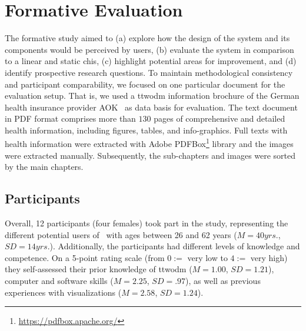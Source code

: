 \section{Formative Evaluation}\label{sec:evaluation}

The formative study aimed to 
(a) explore how the design of the system and its components would be perceived by users, 
(b) evaluate the system in comparison to a linear and static \acrshort{chis}, 
(c) highlight potential areas for improvement, and 
(d) identify prospective research questions.
%
To maintain methodological consistency and participant comparability, we focused on one particular document for the evaluation setup. 
%
That is, we used a \acrshort{ttwodm} information brochure of the German health insurance provider AOK~\cite{aok} as data basis for evaluation. 
%
The text document in PDF format comprises more than $130$ pages of comprehensive and detailed health information, including figures, tables, and info-graphics. 
%
Full texts with health information were extracted with Adobe PDFBox\footnote{\url{https://pdfbox.apache.org/}} library and the images were extracted manually. 
%
Subsequently, the sub-chapters and images were sorted by the main chapters. 


\subsection{Participants}
%
Overall, 12 participants (four females) took part in the study, representing the different potential users of \apluschis\ with ages between 26 and 62 years ($M = 40 \unit{yrs.}$, $SD = 14 \unit{yrs.}$). 
%
Additionally, the participants had different levels of knowledge and competence. On a 5-point rating scale (from $0 := $ very low to $4 := $ very high) they self-assessed their prior knowledge of \acrshort{ttwodm} ($M = 1.00$, $SD = 1.21$), computer and software skills ($M = 2.25$, $SD = .97$), as well as previous experiences with visualizations ($M = 2.58$, $SD = 1.24$).

